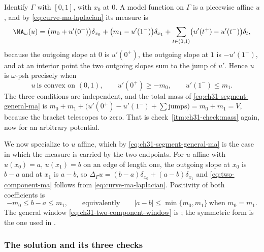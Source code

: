 Identify $\Gamma$ with $[0,1]$, with $x_0$ at $0$.  A model function
on $\Gamma$ is a piecewise affine $u$, and by
\eqref{eq:curve-ma-laplacian} its measure is
\begin{equation}
\label{eq:ch31-segment-general-ma}
 \MA_\omega(u)
 =\bigl(m_0+u'(0^+)\bigr)\delta_{x_0}
  +\bigl(m_1-u'(1^-)\bigr)\delta_{x_1}
  +\sum_{t\in(0,1)}\bigl(u'(t^+)-u'(t^-)\bigr)\delta_t ,
\end{equation}
because the outgoing slope at $0$ is $u'(0^+)$, the outgoing slope at
$1$ is $-u'(1^-)$, and at an interior point the two outgoing slopes sum
to the jump of $u'$.  Hence $u$ is $\omega$-psh precisely when
\begin{equation}
\label{eq:ch31-segment-psh}
 u\ \text{is convex on }(0,1),
 \qquad u'(0^+)\geq-m_0,
 \qquad u'(1^-)\leq m_1 .
\end{equation}
The three conditions are independent, and the total mass of
\eqref{eq:ch31-segment-general-ma} is
$m_0+m_1+\bigl(u'(0^+)-u'(1^-)+\sum\text{jumps}\bigr)=m_0+m_1=V$, because
the bracket telescopes to zero.  That is
check~\cref{itm:ch31-check:mass} again, now for an arbitrary potential.

We now specialize to $u$ affine, which by
\eqref{eq:ch31-segment-general-ma} is the case in which the measure is
carried by the two endpoints.  For $u$ affine with
$u(x_0)=a$, $u(x_1)=b$ on an edge of length one,
the outgoing slope at $x_0$ is $b-a$ and at $x_1$ is $a-b$, so
$\Delta_\Gamma u=(b-a)\delta_{x_0}+(a-b)\delta_{x_1}$ and
\eqref{eq:two-component-ma} follows from
\eqref{eq:curve-ma-laplacian}.  Positivity of both coefficients is
\begin{equation}
\label{eq:ch31-two-component-window}
 -m_0\leq b-a\leq m_1,
 \qquad\text{equivalently}\qquad
 |a-b|\leq\min\{m_0,m_1\}\ \text{when }m_0=m_1 .
\end{equation}
The general window \eqref{eq:ch31-two-component-window} is
; the symmetric form is the one used in
.

\subsubsection*{The solution and its three checks}

